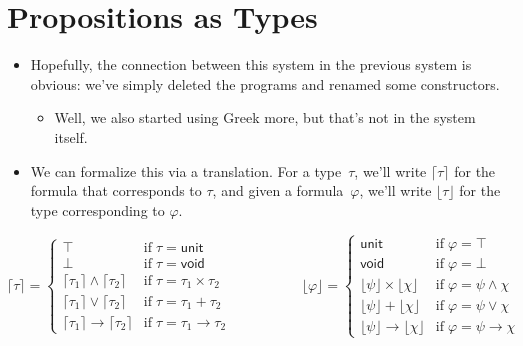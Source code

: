 \documentclass{lecturenotes}
\newcommand{\utype}{\textsf{unit}\xspace}
\newcommand{\vtype}{\textsf{void}\xspace}
\newcommand{\toform}[1]{\ensuremath{\lceil #1 \rceil}}
\newcommand{\totype}[1]{\ensuremath{\lfloor #1 \rfloor}}
\begin{document}
\newpage
\section{Propositions as Types}
\label{sec:prop-as-types}

\begin{itemize}
\item Hopefully, the connection between this system in the previous system is obvious: we've simply deleted the programs and renamed some constructors.
  \begin{itemize}
  \item Well, we also started using Greek more, but that's not in the system itself.
  \end{itemize}
\item We can formalize this via a translation.
  For a type~$\tau$, we'll write $\toform{\tau}$ for the formula that corresponds to $\tau$, and given a formula~$\varphi$, we'll write $\totype{\tau}$ for the type corresponding to $\varphi$.
\end{itemize}

$$\toform{\tau} = \left\{\begin{array}{ll}
  \top & \text{if}\;\tau = \utype\\
  \bot & \text{if}\;\tau = \vtype\\
  \toform{\tau_1} \land \toform{\tau_2} & \text{if}\;\tau=\tau_1 \times \tau_2\\
  \toform{\tau_1} \lor \toform{\tau_2} & \text{if}\;\tau=\tau_1 + \tau_2\\
  \toform{\tau_1} \to \toform{\tau_2} & \text{if}\;\tau=\tau_1 \to \tau_2
\end{array}\right.
\hspace{5em}
\totype{\varphi} = \left\{\begin{array}{ll}
  \utype & \text{if}\;\varphi = \top\\
  \vtype & \text{if}\;\varphi = \bot\\
  \totype{\psi} \times \totype{\chi} & \text{if}\;\varphi = \psi \land \chi\\
  \totype{\psi} + \totype{\chi} & \text{if}\;\varphi = \psi \lor \chi\\
  \totype{\psi} \to \totype{\chi} & \text{if}\;\varphi = \psi \to \chi
\end{array}\right.
$$
\end{document}
